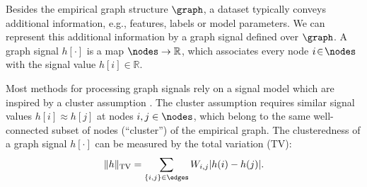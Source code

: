 \documentclass[12pt]{report}
\begin{document}
%
%

Besides the empirical graph structure $\graph$, a dataset 
typically conveys additional information, e.g., features, labels 
or model parameters. We can represent this additional 
information by a graph signal defined over $\graph$. 
A graph signal $h[\cdot]$ is a map $\nodes \rightarrow \mathbb{R}$, 
which associates every node $i\!\in\!\nodes$ with the signal 
value $h[i] \!\in\! \mathbb{R}$. 

Most methods for processing graph signals rely on a signal model which are inspired by a cluster 
assumption \cite{SemiSupervisedBook}. The cluster assumption requires similar signal values $h[i] \approx h[j]$ 
at nodes $i,j \in \nodes$, which belong to the same well-connected subset of nodes (``cluster'') of the empirical graph. 
The clusteredness of a graph signal $h[\cdot]$ can be measured by the total variation (TV): 
\begin{equation}
\label{equ_def_TV}
 \| h \|_{\rm TV} = \sum_{\{i,j\} \in \edges} W_{i,j} |h(i) - h(j)|. 
\end{equation} 
 
\end{document}
